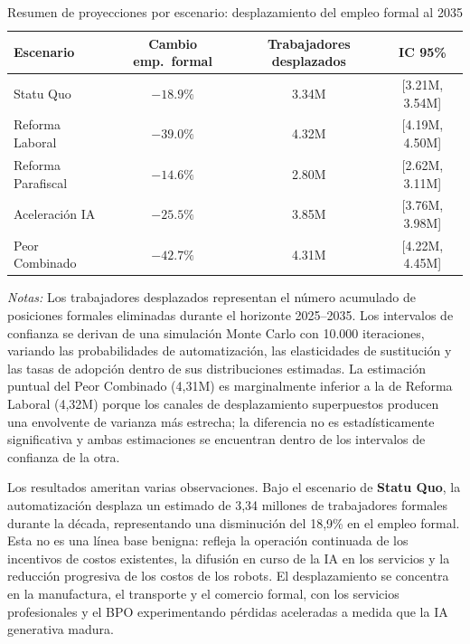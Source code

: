 \documentclass{article}
\begin{document}
\begin{table}[htbp]
\centering
\caption{Resumen de proyecciones por escenario: desplazamiento del empleo formal al 2035}
\label{tab:scenarios}
\begin{threeparttable}
\begin{tabular}{lccc}
\toprule
\textbf{Escenario} & \textbf{Cambio emp.\ formal} & \textbf{Trabajadores desplazados} & \textbf{IC 95\%} \\
\midrule
Statu Quo & $-18.9\%$ & 3.34M & [3.21M, 3.54M] \\
Reforma Laboral & $-39.0\%$ & 4.32M & [4.19M, 4.50M] \\
Reforma Parafiscal & $-14.6\%$ & 2.80M & [2.62M, 3.11M] \\
Aceleraci\'on IA & $-25.5\%$ & 3.85M & [3.76M, 3.98M] \\
Peor Combinado & $-42.7\%$ & 4.31M & [4.22M, 4.45M] \\
\bottomrule
\end{tabular}
\begin{tablenotes}
\small
\item \textit{Notas:} Los trabajadores desplazados representan el n\'umero acumulado de posiciones formales eliminadas durante el horizonte 2025--2035. Los intervalos de confianza se derivan de una simulaci\'on Monte Carlo con 10.000 iteraciones, variando las probabilidades de automatizaci\'on, las elasticidades de sustituci\'on y las tasas de adopci\'on dentro de sus distribuciones estimadas. La estimaci\'on puntual del Peor Combinado (4,31M) es marginalmente inferior a la de Reforma Laboral (4,32M) porque los canales de desplazamiento superpuestos producen una envolvente de varianza m\'as estrecha; la diferencia no es estad\'isticamente significativa y ambas estimaciones se encuentran dentro de los intervalos de confianza de la otra.
\end{tablenotes}
\end{threeparttable}
\end{table}

Los resultados ameritan varias observaciones. Bajo el escenario de \textbf{Statu Quo}, la automatizaci\'on desplaza un estimado de 3,34 millones de trabajadores formales durante la d\'ecada, representando una disminuci\'on del 18,9\% en el empleo formal. Esta no es una l\'inea base benigna: refleja la operaci\'on continuada de los incentivos de costos existentes, la difusi\'on en curso de la IA en los servicios y la reducci\'on progresiva de los costos de los robots. El desplazamiento se concentra en la manufactura, el transporte y el comercio formal, con los servicios profesionales y el BPO experimentando p\'erdidas aceleradas a medida que la IA generativa madura.
\end{document}
